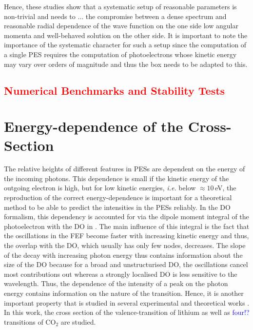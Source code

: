 Hence, these studies show that a systematic setup of reasonable parameters is non-trivial and needs to ... the compromise between a dense spectrum and reasonable radial dependence of the wave function on the one side low angular momenta and well-behaved solution on the other side.
It is important to note the importance of the systematic character for such a setup since the computation of a single PES requires the computation of photoelectrons whose kinetic energy may vary over orders of magnitude and thus the box needs to be adapted to this.

\textcolor{red}{\section{Numerical Benchmarks and Stability Tests}}

\section{Energy-dependence of the Cross-Section}
\label{sec:cs}
The relative heights of different features in PESs are dependent on the energy of the incoming photons.
This dependence is small if the kinetic energy of the outgoing electron is high, but for low kinetic energies, \textit{i.e.} below $\approx 10\,$eV, the reproduction of the correct energy-dependence is important for a theoretical method to be able to predict the intensities in the PESs reliably.
In the DO formalism, this dependency is accounted for via the dipole moment integral of the photoelectron with the DO in .
The main influence of this integral is the fact that the oscillations in the FEF become faster with increasing kinetic energy and thus, the overlap with the DO, which usually has only few nodes, decreases.
The slope of the decay with increasing photon energy thus contains information about the size of the DO because for a broad and unstructurised DO, the oscillations cancel most contributions out whereas a strongly localised DO is less sensitive to the wavelength.
Thus, the dependence of the intensity of a peak on the photon energy contains information on the nature of the transition.
Hence, it is another important property that is studied in several experimental and theoretical works \cite{LiNaRef1,LiCS,stieltje}.
In this work, the cross section of the valence-transition of lithium as well as \textcolor{blue}{four!?} transitions of CO$_2$ are studied.

